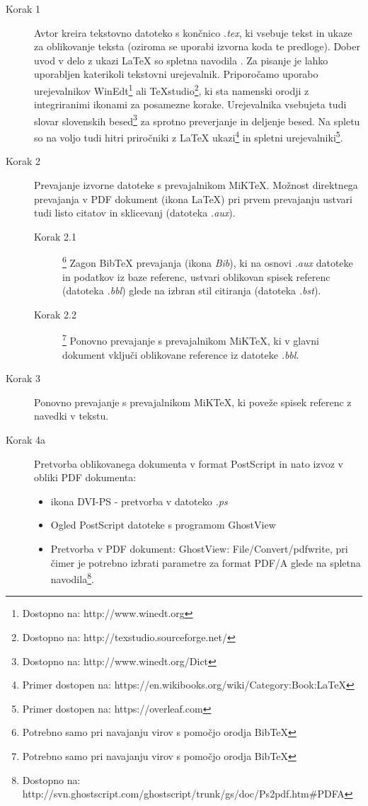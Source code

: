 \documentclass[a4paper,twoside,openright,12pt,slovene]{book}
\begin{document}
\begin{description}
    \item[Korak 1] Avtor kreira tekstovno datoteko s končnico \emph{.tex}, ki vsebuje tekst in ukaze za oblikovanje teksta (oziroma se uporabi izvorna koda te predloge). Dober uvod v delo z ukazi LaTeX so spletna navodila \cite{oetiker1995not}. Za pisanje je lahko uporabljen katerikoli tekstovni urejevalnik. Priporočamo uporabo urejevalnikov WinEdt\footnote{Dostopno na: http://www.winedt.org} ali TeXstudio\footnote{Dostopno na: http://texstudio.sourceforge.net/}, ki sta namenski orodji z integriranimi ikonami za posamezne korake. Urejevalnika vsebujeta tudi slovar slovenskih besed\footnote{Dostopno na: http://www.winedt.org/Dict} za sprotno preverjanje in deljenje besed. Na spletu so na voljo tudi hitri priročniki z LaTeX ukazi\footnote{Primer dostopen na: https://en.wikibooks.org/wiki/Category:Book:LaTeX} in spletni urejevalniki\footnote{Primer dostopen na: https://overleaf.com}.
    \item[Korak 2] Prevajanje izvorne datoteke s prevajalnikom MiKTeX. Možnost direktnega prevajanja v PDF dokument (ikona LaTeX) pri prvem prevajanju ustvari tudi listo citatov in sklicevanj (datoteka \emph{.aux}).
    \begin{description}
        \item[Korak 2.1]\footnote{Potrebno samo pri navajanju virov s pomočjo orodja BibTeX} Zagon BibTeX prevajanja (ikona \emph{Bib}), ki na osnovi \emph{.aux} datoteke in podatkov iz baze referenc, ustvari oblikovan spisek referenc (datoteka \emph{.bbl}) glede na izbran stil citiranja (datoteka \emph{.bst}).
        \item[Korak 2.2]\footnote{Potrebno samo pri navajanju virov s pomočjo orodja BibTeX} Ponovno prevajanje s prevajalnikom MiKTeX, ki v glavni dokument vključi oblikovane reference iz datoteke \emph{.bbl}.
    \end{description}
    \item[Korak 3] Ponovno prevajanje s prevajalnikom MiKTeX, ki poveže spisek referenc z navedki v tekstu.
    \item[Korak 4a] Pretvorba oblikovanega dokumenta v format PostScript in nato izvoz v obliki PDF dokumenta:
    \begin{itemize}[noitemsep]
        \item ikona DVI-PS - pretvorba v datoteko \emph{.ps}
        \item Ogled PostScript datoteke s programom GhostView
        \item Pretvorba v PDF dokument: GhostView: File/Convert/pdfwrite, pri čimer je potrebno izbrati parametre za format PDF/A glede na spletna navodila\footnote{Dostopno na: http://svn.ghostscript.com/ghostscript/trunk/gs/doc/Ps2pdf.htm\#PDFA}.

\end{itemize}
\end{description}
\end{document}
